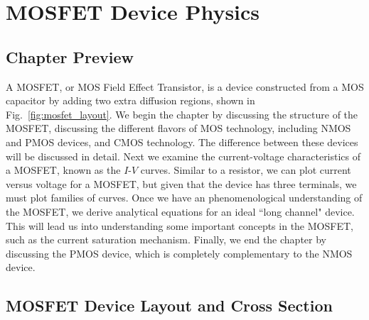 \chapter{MOSFET Device Physics}
\graphicspath{{./figs_mos/}}
\section{Chapter Preview}
A MOSFET, or MOS Field Effect Transistor, is a device constructed from a MOS capacitor by adding two extra diffusion regions, shown in Fig.~\ref{fig:mosfet_layout}.  We begin the chapter by discussing the structure of the MOSFET, discussing the different flavors of MOS technology, including NMOS and PMOS devices, and CMOS technology.  The difference between these devices will be discussed in detail.  Next we examine the current-voltage characteristics of a MOSFET, known as the $I$-$V$ curves.  Similar to a resistor, we can plot current versus voltage for a MOSFET, but given that the device has three terminals, we must plot families of curves.  Once we have an phenomenological understanding of the MOSFET, we derive analytical equations for an ideal ``long channel" device.  This will lead us into understanding some important concepts in the MOSFET, such as the current saturation mechanism.  Finally, we end the chapter by discussing the PMOS device, which is completely complementary to the NMOS device.
\section{MOSFET Device Layout and Cross Section}
